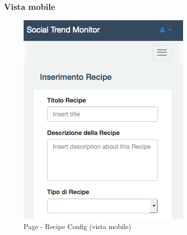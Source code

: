 		\subsubsection{Vista mobile} %
		\begin{figure}[htbp]
			\centering
			\centerline{\includegraphics[scale=0.5]{./images/mockup/recipe_config_vm.png}}
			\caption{Page - Recipe Config (vista mobile)}
		\end{figure}		%


